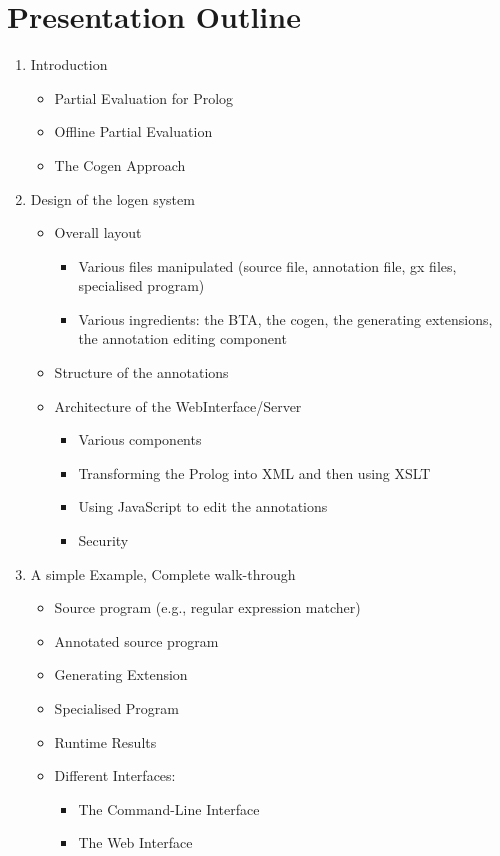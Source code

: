 \documentclass{sig-alternate}
\begin{document}
\section{Presentation Outline}


\begin{enumerate}
\item Introduction
  \begin{itemize}
  \item Partial Evaluation for Prolog
 \item Offline Partial Evaluation
 \item The Cogen Approach
  \end{itemize}
 
 \item Design of the {\sc logen} system
  \begin{itemize}
    \item Overall layout
       \begin{itemize}
    \item Various files manipulated (source file, annotation file, gx files, specialised program)
     \item Various ingredients: the BTA, the cogen, the generating extensions, the annotation editing component
     \end{itemize}
    \item Structure of the annotations
    \item Architecture of the WebInterface/Server
           \begin{itemize}
    \item Various components
    \item Transforming the Prolog into XML and then using XSLT
    \item Using JavaScript to edit the annotations
    \item Security
    \end{itemize}
  \end{itemize}
  
 \item A simple Example, Complete walk-through
  \begin{itemize}
    \item Source program (e.g., regular expression matcher)
    \item Annotated source program
    \item Generating Extension
    \item Specialised Program
    \item Runtime Results
    \item Different Interfaces:
     \begin{itemize}
    \item The Command-Line Interface
    \item The Web Interface
    \end{itemize}
     

\end{itemize}
\end{enumerate}
\end{document}

